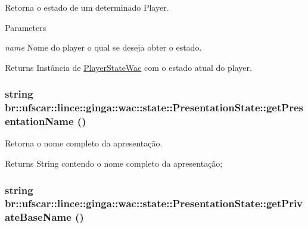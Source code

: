 Retorna o estado de um determinado Player. 
\begin{DoxyParams}{Parameters}
\item[{\em name}]Nome do player o qual se deseja obter o estado. \end{DoxyParams}
\begin{DoxyReturn}{Returns}
Instância de \hyperlink{classbr_1_1ufscar_1_1lince_1_1ginga_1_1wac_1_1state_1_1PlayerStateWac}{PlayerStateWac} com o estado atual do player. 
\end{DoxyReturn}
\hypertarget{classbr_1_1ufscar_1_1lince_1_1ginga_1_1wac_1_1state_1_1PresentationState_a287ab3031a3c0d2cf3fe065db40753cd}{
\subsubsection[{getPresentationName}]{\setlength{\rightskip}{0pt plus 5cm}string br::ufscar::lince::ginga::wac::state::PresentationState::getPresentationName ()}}
\label{classbr_1_1ufscar_1_1lince_1_1ginga_1_1wac_1_1state_1_1PresentationState_a287ab3031a3c0d2cf3fe065db40753cd}


Retorna o nome completo da apresentação. \begin{DoxyReturn}{Returns}
String contendo o nome completo da apresentação; 
\end{DoxyReturn}
\hypertarget{classbr_1_1ufscar_1_1lince_1_1ginga_1_1wac_1_1state_1_1PresentationState_ad1a6ffea4ce3b37974c58d3aeeb10eed}{
\subsubsection[{getPrivateBaseName}]{\setlength{\rightskip}{0pt plus 5cm}string br::ufscar::lince::ginga::wac::state::PresentationState::getPrivateBaseName ()}}
\label{classbr_1_1ufscar_1_1lince_1_1ginga_1_1wac_1_1state_1_1PresentationState_ad1a6ffea4ce3b37974c58d3aeeb10eed}


